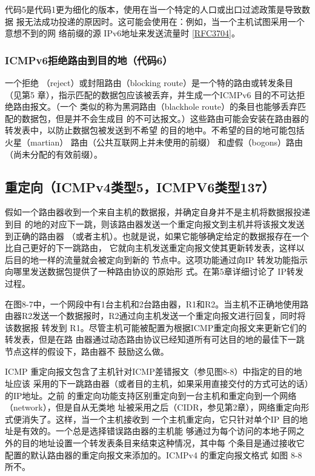 代码5是代码1更为细化的版本，使用在当一个特定的人口或出口过滤政策是导致数据
报无法成功投递的原因时。这可能会使用在：例如，当一个主机试图采用一个意想不到的网
络前缀的源 IPv6地址来发送流量时 \href{https://www.rfc-editor.org/rfc/rfc3704}{[RFC3704]}。

\subsubsection{ICMPv6拒绝路由到目的地（代码6）}
一个拒绝 （reject）或封阻路由（blocking route）是一个特的路由或转发条目（见第5
章），指示匹配的数据包应该被丢弃，并生成一个ICMPv6 目的不可达拒绝路由报文。（一个
类似的称为黑洞路由（blackhole route）的条目也能够丢弃匹配的数据包，但是并不会生成目
的不可达报文。）这些路由可能会安装在路由器的转发表中，以防止数据包被发送到不希望
的目的地中。不希望的目的地可能包括火星（martian） 路由（公共互联网上并未使用的前缀）
和虚假（bogons）路由（尚未分配的有效前缀）。

\subsection{重定向（ICMPv4类型5，ICMPV6类型137）}

假如一个路由器收到一个来自主机的数据报，并确定自身并不是主机将数据报投递到目
的地的对应下一跳，则该路由器发送一个重定向报文到主机并将该报文发送到正确的路由器
（或者主机）。也就是说，如果它能够确定给定的数据报存在一个比自己更好的下一跳路由，
它就向主机发送重定向报文使其更新转发表，这样以后目的地一样的流量就会被定向到新的
节点中。这项功能通过向IP 转发功能指示向哪里发送数据包提供了一种路由协议的原始形
式。在第5章详细讨论了 IP转发过程。

在图8-7中，一个网段中有1台主机和2台路由器，R1和R2。当主机不正确地使用路
由器R2发送一个数据报时，R2通过向主机发送一个重定向报文进行回复，同时将该数据报
转发到 R1。尽管主机可能被配置为根据ICMP重定向报文来更新它们的转发表，但是在路
由器通过动态路由协议已经知道所有可达目的地的最佳下一跳节点这样的假设下，路由器不
鼓励这么做。

ICMP 重定向报文包含了主机针对ICMP差错报文（参见图8-8）中指定的目的地址应该
采用的下一跳路由器（或者目的主机，如果采用直接交付的方式可达的话）的IP地址。之前
的重定向功能支持区别重定向到一台主机和重定向到一个网络（network），但是自从无类地
址被采用之后（CIDR，参见第2章），网络重定向形式便消失了。这样，当一个主机接收到
一个主机重定向，它只针对单个IP 目的地址是有效的。一个总是选择错误路由器的主机能
够通过为每个访问的本地子网之外的目的地址设置一个转发表条目来结束这种情况，其中每
个条目是通过接收它配置的默认路由器的重定向报文来添加的。ICMPv4 的重定向报文格式
如图 8-8 所不。


